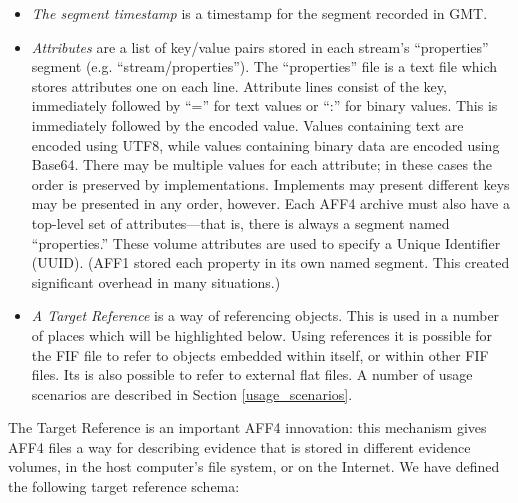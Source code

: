 \documentclass[10pt, conference]{IEEEtran}
\begin{document}
\begin{itemize}
\item \emph{The segment timestamp} is a timestamp for the segment
  recorded in GMT.

\item \emph{Attributes} are a list of key/value pairs stored in each
stream's ``properties'' segment (e.g. ``stream/properties''). The
``properties'' file is a text file which stores attributes one on each
line. Attribute lines consist of the key, immediately followed by
``='' for text values or ``:'' for binary values. This is immediately
followed by the encoded value. Values containing text are encoded
using UTF8, while values containing binary data are encoded using
Base64. There may be multiple values for each attribute; in these
cases the order is preserved
by implementations. Implements may present different keys may be
presented in any order, however.
\vspace{1ex}
Each AFF4 archive must also have a top-level set of attributes---that
is, there is always a segment named ``properties.'' These volume
attributes are used to specify a Unique Identifier (UUID). (AFF1
stored each property in its own named segment. This created
significant overhead in many situations.)

\item \emph{A Target Reference} is a way of referencing objects. This is used
in a number of places which will be highlighted below. Using
references it is possible for the FIF file to refer to objects
embedded within itself, or within other FIF files. Its is also
possible to refer to external flat files. A number of usage scenarios
are described in Section \ref{usage_scenarios}. 
\end{itemize}

The Target Reference is an important AFF4 innovation: this mechanism
gives AFF4 files a way for describing evidence that is stored in
different evidence volumes, in the host computer's file system, or on
the Internet. We have defined the following target reference schema:

\label{target_reference}
\end{document}
